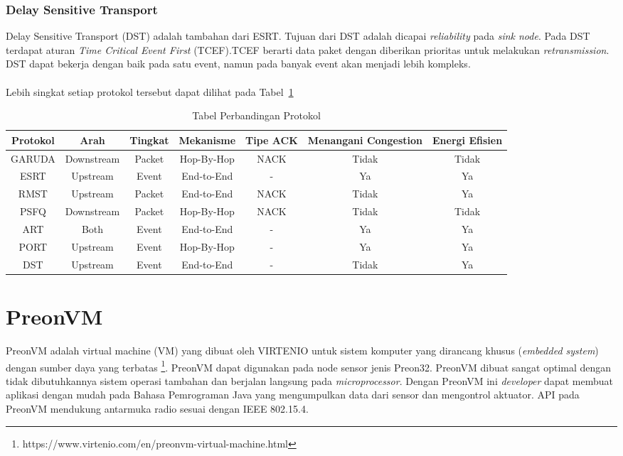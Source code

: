 \subsubsection{Delay Sensitive Transport \cite{dst}}
Delay Sensitive Transport (DST) adalah tambahan dari ESRT. Tujuan dari DST adalah dicapai \textit{reliability} pada \textit{sink node}. Pada DST terdapat aturan \textit{Time Critical Event First} (TCEF).TCEF berarti data paket dengan diberikan prioritas untuk melakukan \textit{retransmission}. DST dapat bekerja dengan baik pada satu event, namun pada banyak event akan menjadi lebih kompleks.
\\
\\
Lebih singkat setiap protokol tersebut dapat dilihat pada Tabel~\ref{tab:protokol_reliable}
\begin{table}[H] %
	\centering 
	\caption{Tabel Perbandingan Protokol}
	\label{tab:protokol_reliable}
	\begin{tabular}{|c|c|c|c|c|c|c|}
	\hline
		Protokol & Arah & Tingkat & Mekanisme & Tipe ACK & Menangani Congestion & Energi Efisien \\
    \hline
		GARUDA & Downstream & Packet & Hop-By-Hop & NACK & Tidak & Tidak\\
		ESRT & Upstream & Event & End-to-End & - & Ya & Ya\\
		RMST & Upstream & Packet & End-to-End & NACK & Tidak & Ya\\
		PSFQ & Downstream & Packet & Hop-By-Hop & NACK & Tidak & Tidak\\
		ART & Both & Event & End-to-End	 & - & Ya & Ya\\
		PORT & Upstream & Event & Hop-By-Hop & - & Ya & Ya\\
		DST & Upstream & Event & End-to-End & - & Tidak & Ya\\
    \hline
	\end{tabular} 
\end{table}

\section{PreonVM}
\label{sec:PreonVM}
PreonVM adalah virtual machine (VM) yang dibuat oleh VIRTENIO untuk sistem komputer yang dirancang khusus (\textit{embedded system}) dengan sumber daya yang terbatas \footnote{https://www.virtenio.com/en/preonvm-virtual-machine.html}. PreonVM dapat digunakan pada node sensor jenis Preon32. PreonVM dibuat sangat optimal dengan tidak dibutuhkannya sistem operasi tambahan dan berjalan langsung pada \textit{microprocessor}. Dengan PreonVM ini \textit{developer} dapat membuat aplikasi dengan mudah pada Bahasa Pemrograman Java yang mengumpulkan data dari sensor dan mengontrol aktuator. API pada PreonVM mendukung antarmuka radio sesuai dengan IEEE 802.15.4. 

